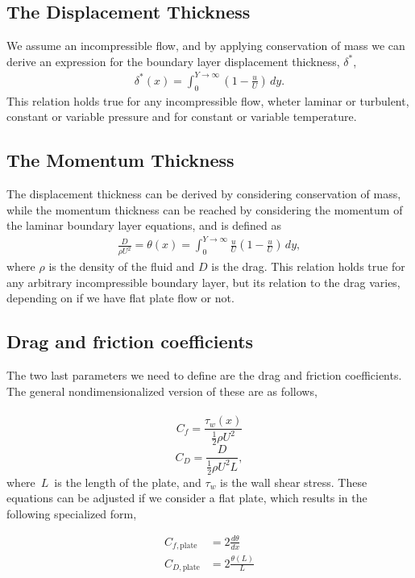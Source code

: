 \documentclass[12pt]{amsart}
\begin{document}
\subsection*{The Displacement Thickness}
We assume an incompressible flow, and by applying conservation of mass we can derive an expression for the boundary layer displacement thickness, $\delta^*$,
\begin{align}
  \delta^*(x) = \int_0^{Y \rightarrow \infty} \left( 1 - \frac{u}{U} \right)\, dy.
\end{align}
This relation holds true for any incompressible flow, wheter laminar or turbulent, constant or variable pressure and for constant or variable temperature.
\subsection*{The Momentum Thickness}
The displacement thickness can be derived by considering conservation of mass, while the momentum thickness can be reached by considering the momentum of the laminar boundary layer equations, and is defined as
\begin{align}
  \frac{D}{\rho U^2}  =\theta(x) = \int_0^{Y \rightarrow \infty} \frac{u}{U}\left( 1 - \frac{u}{U} \right)\, dy,
\end{align}
where $\rho$ is the density of the fluid and $D$ is the drag.
This relation holds true for any arbitrary incompressible boundary layer, but its relation to the drag varies, depending on if we have flat plate flow or not.

\subsection*{Drag and friction coefficients}
The two last parameters we need to define are the drag and friction coefficients. The general nondimensionalized version of these are as follows,\\\\
\[
  C_f = \frac{\tau_w(x)}{\frac{1}{2}\rho U^2}
\]
\[
  C_D = \frac{D}{\frac{1}{2} \rho U^2 L},
\]
where $L$ is the length of the plate, and $\tau_w$ is the wall shear stress. These equations can be adjusted if we consider a flat plate, which results in the following specialized form, 

\begin{align}
  C_{f,\text{plate}} &= 2 \frac{d \theta}{dx}\\[1.0em]
  C_{D, \text{plate}} &= 2 \frac{\theta(L)}{L} 
\end{align}
\end{document}
